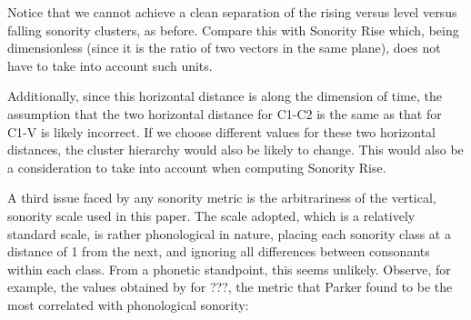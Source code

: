 \documentclass[12pt]{article}
\begin{document}

Notice that we cannot achieve a clean separation of the rising versus level versus falling sonority clusters, as before. Compare this with {\sc Sonority Rise} which, being dimensionless (since it is the ratio of two vectors in the same plane), does not have to take into account such units.

Additionally, since this horizontal distance is along the dimension of time, the assumption that the two horizontal distance for C1-C2 is the same as that for C1-V is likely incorrect. If we choose different values for these two horizontal distances, the cluster hierarchy would also be likely to change. This would also be a consideration to take into account when computing {\sc Sonority Rise}.

\bigskip

 A third issue faced by any sonority metric is the arbitrariness of the vertical, sonority scale used in this paper. The scale adopted, which is a relatively standard scale, is rather phonological in nature, placing each sonority class at a distance of 1 from the next, and ignoring all differences between consonants within each class. From a phonetic standpoint, this seems unlikely. Observe, for example, the values obtained by \citet{parker.2002} for ???, the metric that Parker found to be the most correlated with phonological sonority:
\end{document}

